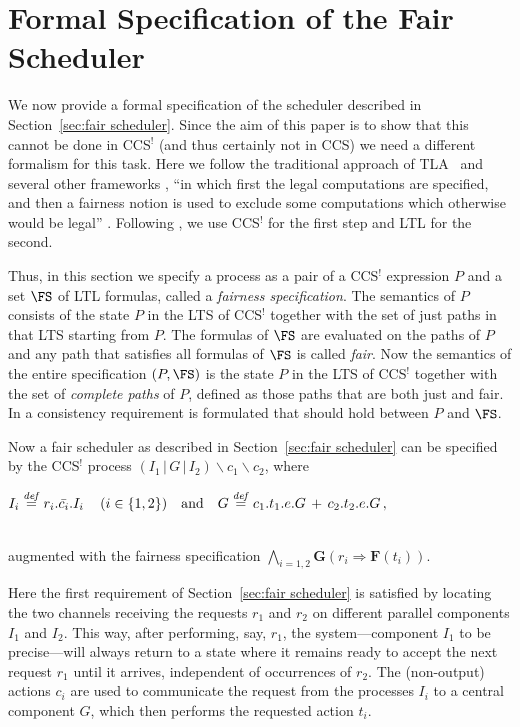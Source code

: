 \documentclass[smallcondensed]{svjour3}
\newcommand{\Sect}[1]{Section~\ref{sec:#1}}
\begin{document}
\section{Formal Specification of the Fair Scheduler}\label{sec:fair spec}
 
\renewcommand{\d}[1]{c_{#1}}
\newcommand{\db}[1]{c_{{#1}}!}
\newcommand{\dr}[1]{c_{#1}?}
\newcommand{\tb}[1]{t_{#1}}
\newcommand{\tr}[1]{t_{#1}?}
\newcommand{\e}{e}
\newcommand{\BB}[1]{B_{#1}}

We now provide a formal specification of the scheduler described in \Sect{fair scheduler}.
Since the aim of this paper is to show that this cannot be done in CCS$^!$ (and thus certainly not
in CCS) we need a different formalism for this task. Here we follow the
traditional approach of TLA~\cite{TLA} and several other frameworks \cite{Fr86}, ``in which
first the legal computations are specified, and then a fairness notion
is used to exclude some computations which otherwise would be legal'' \cite{AFK88}.
Following \cite{GH14}, we use CCS$^!$ for the first step and LTL for the second.

Thus, in this section we specify a process as a pair of a CCS$^!$ expression $P$ and a set $\FS$ of LTL
formulas, called a \emph{fairness specification}. The semantics of $P$ consists of the state $P$ in
the LTS of CCS$^!$ together with the set of just paths in that LTS starting from $P$. 
The formulas of $\FS$ are evaluated on the paths of $P$ and any path that satisfies all
formulas of $\FS$ is called \emph{fair}. Now the semantics of the entire specification $(P,\FS)$ is the
state $P$ in the LTS of CCS$^!$ together with the set of \emph{complete paths} of $P$,
defined as those paths that are both just and fair.
In \cite{TR13,GH14} a consistency requirement is formulated that should hold between $P$ and $\FS$.

Now a fair scheduler as described in \Sect{fair scheduler} can be specified by the CCS$^!$ process
$
(I_{1}\,|\,G\,|\,I_{2})\backslash \d1\backslash\d2
$, 
where\\[.5mm]
\centerline{$
I_{i}\stackrel{\it def}{=} r_i.\bar{c_i}.I_{i}\,\quad (i\in\{1,2\})
\quad \mbox{and}\quad
G\stackrel{\it def}{=}c_1.\tb1.\e.G  \,+\, c_2.\tb2.\e.G \,,
$}\\[1mm]
augmented with the fairness specification
$
\bigwedge_{i=1,2}\mathbf{G}(r_i \Rightarrow \mathbf{F}(t_i))
$.

Here the first requirement of \Sect{fair scheduler} is satisfied by locating the two
channels receiving the requests $r_1$ and $r_2$ on different parallel components $I_{1}$ and $I_{2}$.
This way, after performing, say, $r_1$, the system---component $I_{1}$ to be precise---will always return
to a state where it remains ready to accept the next request $r_1$ until it arrives, independent of
occurrences of $r_2$.
The (non-output) actions $c_{i}$ are used to communicate the request from the processes $I_{i}$ to 
a central component $G$, which then performs the requested action $t_{i}$.
\end{document}
